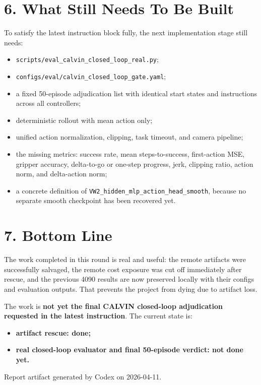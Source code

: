 \documentclass[11pt]{article}
\begin{document}
\section*{6. What Still Needs To Be Built}
To satisfy the latest instruction block fully, the next implementation stage still needs:
\begin{itemize}
  \item \texttt{scripts/eval\_calvin\_closed\_loop\_real.py};
  \item \texttt{configs/eval/calvin\_closed\_loop\_gate.yaml};
  \item a fixed 50-episode adjudication list with identical start states and instructions across all controllers;
  \item deterministic rollout with mean action only;
  \item unified action normalization, clipping, task timeout, and camera pipeline;
  \item the missing metrics:
    success rate, mean steps-to-success, first-action MSE, gripper accuracy, delta-to-go or one-step progress, jerk, clipping ratio, action norm, and delta-action norm;
  \item a concrete definition of \texttt{VW2\_hidden\_mlp\_action\_head\_smooth}, because no separate smooth checkpoint has been recovered yet.
\end{itemize}

\section*{7. Bottom Line}
The work completed in this round is real and useful: the remote artifacts were successfully salvaged, the remote cost exposure was cut off immediately after rescue, and the previous 4090 results are now preserved locally with their configs and evaluation outputs. That prevents the project from dying due to artifact loss.

The work is \textbf{not yet the final CALVIN closed-loop adjudication requested in the latest instruction}. The current state is:
\begin{itemize}
  \item \textbf{artifact rescue: done;}
  \item \textbf{real closed-loop evaluator and final 50-episode verdict: not done yet.}
\end{itemize}

\vfill
\noindent\textcolor{ReportAccent}{Report artifact generated by Codex on 2026-04-11.}
\end{document}
